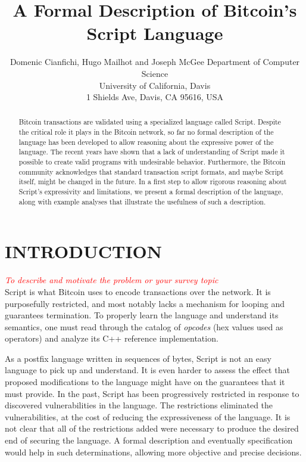 \documentclass[letterpaper, 10 pt, conference]{ieeeconf}
\title{\LARGE \bf
A Formal Description of Bitcoin's Script Language
}
\author{ \parbox{4 in}{
                        \centering Domenic Cianfichi, Hugo Mailhot and Joseph McGee
                        Department of Computer Science\\
                        University of California, Davis\\
                        1 Shields Ave, Davis, CA 95616, USA
                      }
}
\begin{document}
\maketitle
\thispagestyle{empty}
\pagestyle{empty}


\begin{abstract}

Bitcoin transactions are validated using a specialized language called Script. Despite the critical role it plays in the Bitcoin network, so far no formal description of the language has been developed to allow reasoning about the expressive power of the language. The recent years have shown that a lack of understanding of Script made it possible to create valid programs with undesirable behavior. Furthermore, the Bitcoin community acknowledges that standard transaction script formats, and maybe Script itself, might be changed in the future. In a first step to allow rigorous reasoning about Script's expressivity and limitations, we present a formal description of the language, along with example analyses that illustrate the usefulness of such a description.

\end{abstract}


\section{INTRODUCTION}

\textcolor{red}{\textit{To describe and motivate the problem or your survey topic }}\\

Script is what Bitcoin uses to encode transactions over the network. It is purposefully restricted, and most notably lacks a mechanism for looping and guarantees termination. To properly learn the language and understand its semantics, one must read through the catalog of \textit{opcodes} (hex values used as operators) and analyze its C++ reference implementation.

As a postfix language written in sequences of bytes, Script is not an easy language to pick up and understand. It is even harder to assess the effect that proposed modifications to the language might have on the guarantees that it must provide. In the past, Script has been progressively restricted in response to discovered vulnerabilities in the language. The restrictions eliminated the vulnerabilities, at the cost of reducing the expressiveness of the language. It is not clear that all of the restrictions added were necessary to produce the desired end of securing the language. A formal description and eventually specification would help in such determinations, allowing more objective and precise decisions.
\end{document}

